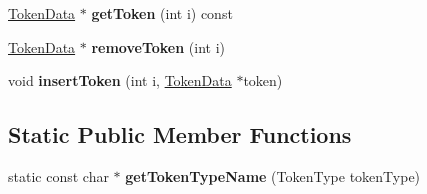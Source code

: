 \begin{DoxyCompactItemize}
\item 
\hyperlink{class_object_script_1_1_o_s_1_1_core_1_1_tokenizer_1_1_token_data}{Token\+Data} $\ast$ {\bfseries get\+Token} (int i) const \hypertarget{class_object_script_1_1_o_s_1_1_core_1_1_tokenizer_a6e13fd058a97f5af30f661fdc0d8d123}{}\label{class_object_script_1_1_o_s_1_1_core_1_1_tokenizer_a6e13fd058a97f5af30f661fdc0d8d123}

\item 
\hyperlink{class_object_script_1_1_o_s_1_1_core_1_1_tokenizer_1_1_token_data}{Token\+Data} $\ast$ {\bfseries remove\+Token} (int i)\hypertarget{class_object_script_1_1_o_s_1_1_core_1_1_tokenizer_a45e9f30185a0bab1a9bbb5d86242960f}{}\label{class_object_script_1_1_o_s_1_1_core_1_1_tokenizer_a45e9f30185a0bab1a9bbb5d86242960f}

\item 
void {\bfseries insert\+Token} (int i, \hyperlink{class_object_script_1_1_o_s_1_1_core_1_1_tokenizer_1_1_token_data}{Token\+Data} $\ast$token)\hypertarget{class_object_script_1_1_o_s_1_1_core_1_1_tokenizer_a60e57dd37ce33bb58b17d330d3249c8a}{}\label{class_object_script_1_1_o_s_1_1_core_1_1_tokenizer_a60e57dd37ce33bb58b17d330d3249c8a}

\end{DoxyCompactItemize}
\subsection*{Static Public Member Functions}
\begin{DoxyCompactItemize}
\item 
static const char $\ast$ {\bfseries get\+Token\+Type\+Name} (Token\+Type token\+Type)\hypertarget{class_object_script_1_1_o_s_1_1_core_1_1_tokenizer_a8c036d60fee54c4e13db47640b6055c0}{}\label{class_object_script_1_1_o_s_1_1_core_1_1_tokenizer_a8c036d60fee54c4e13db47640b6055c0}

\end{DoxyCompactItemize}
